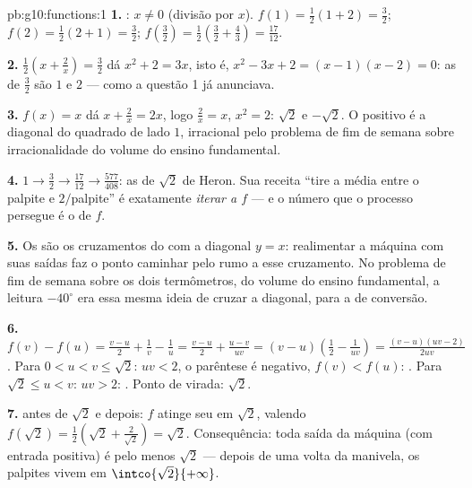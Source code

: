 \begin{solution}{pb:g10:functions:1}
\textbf{1.} : $x \neq 0$ (divisão por $x$). $f(1) =
\frac12(1 + 2) = \frac32$; $f(2) = \frac12(2 + 1) = \frac32$;
$f\!\left(\frac32\right) = \frac12\left(\frac32 +
\frac43\right) = \frac{17}{12}$.

\textbf{2.} $\frac12\left(x + \frac2x\right) = \frac32$ dá
$x^2 + 2 = 3x$, isto é, $x^2 - 3x + 2 = (x - 1)(x - 2) = 0$: as
 de $\frac32$ são $1$ e $2$ --- como a questão 1 já
anunciava.

\textbf{3.} $f(x) = x$ dá $x + \frac2x = 2x$, logo
$\frac2x = x$, $x^2 = 2$:  $\sqrt2$ e $-\sqrt2$. O
positivo é a diagonal do quadrado de lado $1$, irracional pelo
problema de fim de semana sobre irracionalidade do volume do
ensino fundamental.

\textbf{4.} $1 \to \frac32 \to \frac{17}{12} \to
\frac{577}{408}$: as  de $\sqrt2$ de Heron. Sua
receita ``tire a média entre o palpite e $2/$palpite'' é
exatamente \emph{iterar a  $f$} --- e o número que o
processo persegue é o  de $f$.

\textbf{5.} Os  são os cruzamentos do  com a
diagonal $y = x$: realimentar a máquina com suas saídas faz o
ponto caminhar pelo  rumo a esse cruzamento. No problema
de fim de semana sobre os dois termômetros, do volume do ensino
fundamental, a leitura $-40^\circ$ era essa mesma ideia de
cruzar a diagonal, para a  de conversão.

\textbf{6.} $f(v) - f(u) = \frac{v - u}{2} + \frac1v - \frac1u
= \frac{v - u}{2} + \frac{u - v}{uv}
= (v - u)\left(\frac12 - \frac{1}{uv}\right)
= \frac{(v - u)(uv - 2)}{2uv}$. Para $0 < u < v \leq \sqrt2$:
$uv < 2$, o parêntese é negativo, $f(v) < f(u)$: .
Para $\sqrt2 \leq u < v$: $uv > 2$: . Ponto de virada:
$\sqrt2$.

\textbf{7.}  antes de $\sqrt2$ e  depois:
$f$ atinge seu  em $\sqrt2$, valendo
$f(\sqrt2) = \frac12\left(\sqrt2 + \frac{2}{\sqrt2}\right)
= \sqrt2$. Consequência: toda saída da máquina (com entrada
positiva) é pelo menos $\sqrt2$ --- depois de uma volta da
manivela, os palpites vivem em $\intco{\sqrt2}{+\infty}$.


\end{solution}
